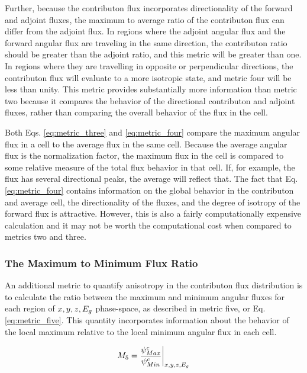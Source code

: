 Further, because the
contributon flux incorporates directionality of the forward and adjoint fluxes,
the maximum to average ratio of the contributon flux can differ from the adjoint
flux. In regions where the adjoint
angular flux and the forward angular flux are traveling in the same direction,
the contributon ratio should be greater than the adjoint ratio, and this metric
will be greater than one. In regions where they are travelling in opposite or
perpendicular directions, the contributon flux will evaluate to a more isotropic
state, and metric four will be less than unity. This metric
provides substantially more information than metric two because
it compares the behavior of the directional contributon and adjoint fluxes,
rather than comparing the overall behavior of the flux in the cell.

Both Eqs. \eqref{eq:metric_three} and \eqref{eq:metric_four} compare the maximum
angular flux in a cell to the average flux in the same cell. Because the average
angular flux is the normalization factor, the maximum flux in the cell is
compared to some relative measure of the total flux behavior in that cell. If,
for example, the flux has several directional peaks, the average will reflect
that.
The fact that Eq. \eqref{eq:metric_four} contains information on the global
behavior in the contributon and average cell, the directionality of the fluxes,
and the degree of isotropy of the forward flux is attractive. However,
this is also a fairly computationally expensive calculation and it may
not be worth the computational cost when compared to metrics two and three.

\subsubsection{The Maximum to Minimum Flux Ratio}

An additional metric to quantify anisotropy in the contributon flux distribution
is to calculate the ratio between the maximum and minimum angular fluxes for
each region of $x,y,z,E_g$ phase-space, as described in metric
five, or Eq. \eqref{eq:metric_five}. This
quantity incorporates information about the
behavior of the local maximum relative to the local
minimum angular flux in each cell.

\begin{equation}
  M_{5} = \frac{\psi^{c}_{Max}}{\psi^{c}_{
          Min}}\bigg\rvert_{x,y,z,E_g}
  \label{eq:metric_five}
\end{equation}

